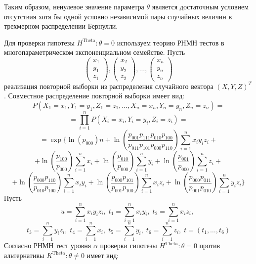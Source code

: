     Таким образом, ненулевое значение параметра
    $\theta$ является достаточным условием отсутствия хотя бы одной
    условно независимой пары
    случайных величин в трехмерном распределении Бернулли.
    
    Для проверки гипотезы $H^{\text{Theta}}:\theta=0$ используем 
    теорию РНМН тестов \cite{Lehmann1986} в многопараметрическом 
    экспоненциальном семействе. Пусть
    $$
        \begin{pmatrix}
            x_1 \\
            y_1 \\
            z_1
        \end{pmatrix},
        \begin{pmatrix}
            x_2 \\
            y_2 \\
            z_2
        \end{pmatrix}, \ldots,
        \begin{pmatrix}
            x_n \\
            y_n \\
            z_n
        \end{pmatrix}
    $$ реализация
    повторной выборки  из распределения случайного вектора $(X,Y,Z)^T$.
    Совместное распределение повторной выборки имеет вид:
    $$
    P(X_1=x_1,Y_1=y_1,Z_1=z_1,\ldots,X_n=x_n,Y_n=y_n,Z_n=z_n)=
    $$
    $$
    =\prod_{i=1}^n P(X_i=x_i,Y_i=y_i,Z_i=z_i) =
    $$
    $$
     =\exp \Biggl\{\ln(p_{000})n + \ln  \left(\dfrac{p_{001}p_{111}p_{010}p_{100}}{p_{011}p_{101}p_{000}p_{110}}\right) \sum_{i=1}^n x_i y_i z_i +
     $$
        $$ +
            \ln\left(\dfrac{p_{100}}{p_{000}}\right) \sum_{i=1}^{n} x_i + \ln\left(\dfrac{p_{010}}{p_{000}}\right) \sum_{i=1}^{n} y_i +
            \ln\left(\dfrac{p_{001}}{p_{000}}\right) \sum_{i=1}^{n} z_i +
        $$
        $$
            +\ln \left(\dfrac{p_{000}p_{110}}{p_{010}p_{100}}\right) \sum_{i=1}^n x_i y_i +
            \ln \left(\dfrac{p_{000}p_{101}}{p_{001}p_{100}}\right) \sum_{i=1}^n x_i z_i +
            \ln \left(\dfrac{p_{000}p_{011}}{p_{001}p_{010}}\right) \sum_{i=1}^n y_i z_i \Biggr\}
        $$
    Пусть 
    $$
        u = \sum_{i=1}^n x_i y_i z_i, \;
        t_1 = \sum_{i=1}^n x_i y_i, \;
        t_2 = \sum_{i=1}^n x_i z_i, \;
    $$
    $$
        t_3 = \sum_{i=1}^n y_i z_i, \;
        t_4 = \sum_{i=1}^n x_i, \;
        t_5 = \sum_{i=1}^n y_i, \;
        t_6 = \sum_{i=1}^n z_i, \;
        t=(t_1,\ldots,t_6)
    $$
    Согласно \cite{Lehmann1986} РНМН тест уровня $\alpha$ проверки гипотезы $H^{\text{Theta}}:\theta=0$ против альтернативы $K^{\text{Theta}}:\theta \neq 0$ имеет вид:
